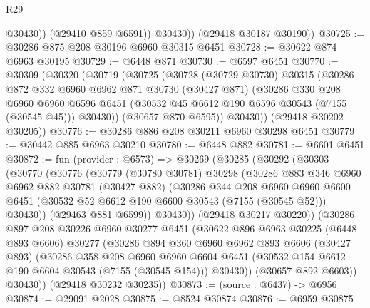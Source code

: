 \begin{lexlean}{R29}
\begin{coremodule}
                @30430))
            (@29410 @859 @6591))
          @30430))
      (@29418 @30187 @30190))
@30725 := @30286 @875 @208 @30196 @6960 @30315 @6451
@30728 := @30622 @874 @6963 @30195
@30729 := @6448 @871
@30730 := @6597 @6451
@30770 := @30309
    (@30320
      (@30719
        (@30725
          (@30728
            (@30729 @30730)
            @30315
            (@30286
              @872
              @332
              @6960
              @6962
              @871
              @30730
              (@30427 @871)
              (@30286
                @330
                @208
                @6960
                @6960
                @6596
                @6451
                (@30532 @45 @6612 @190 @6596 @30543 (@7155 (@30545 @45)))
                @30430))
            (@30657 @870 @6595))
          @30430))
      (@29418 @30202 @30205))
@30776 := @30286 @886 @208 @30211 @6960 @30298 @6451
@30779 := @30442 @885 @6963 @30210
@30780 := @6448 @882
@30781 := @6601 @6451
@30872 := fun (provider : @6573) =>
  @30269
    (@30285
      (@30292
        (@30303
          (@30770
            (@30776
              (@30779
                (@30780 @30781)
                @30298
                (@30286
                  @883
                  @346
                  @6960
                  @6962
                  @882
                  @30781
                  (@30427 @882)
                  (@30286
                    @344
                    @208
                    @6960
                    @6960
                    @6600
                    @6451
                    (@30532 @52 @6612 @190 @6600 @30543 (@7155 (@30545 @52)))
                    @30430))
                (@29463 @881 @6599))
              @30430))
          (@29418 @30217 @30220))
        (@30286
          @897
          @208
          @30226
          @6960
          @30277
          @6451
          (@30622
            @896
            @6963
            @30225
            (@6448 @893 @6606)
            @30277
            (@30286
              @894
              @360
              @6960
              @6962
              @893
              @6606
              (@30427 @893)
              (@30286
                @358
                @208
                @6960
                @6960
                @6604
                @6451
                (@30532 @154 @6612 @190 @6604 @30543 (@7155 (@30545 @154)))
                @30430))
            (@30657 @892 @6603))
          @30430))
      (@29418 @30232 @30235))
@30873 := (source : @6437) -> @6956
@30874 := @29091 @2028
@30875 := @8524 @30874
@30876 := @6959 @30875

\end{coremodule}
\end{lexlean}
